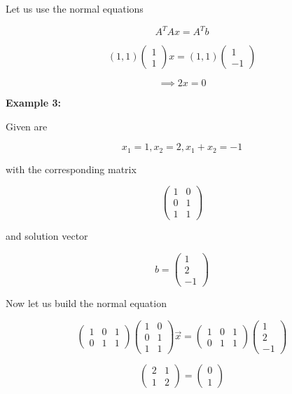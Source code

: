 Let us use the normal equations

\[
	A^T Ax = A^T b
\]

\[
	(1, 1) 
	\begin{pmatrix} 
	1 \\ 
	1
	\end{pmatrix} x
	= 
	(1, 1)
	\begin{pmatrix} 
		1 \\ 
		-1
	\end{pmatrix} 
\]

\[
	\implies 2x = 0
\]

\textbf{Example 3:}

Given are 

\[
	x_1 = 1, x_2 = 2, x_1 + x_2 = -1
\]

with the corresponding matrix

\[
	\begin{pmatrix}
		1 & 0 \\
		0 & 1 \\
		1 & 1  
	\end{pmatrix}
\]

and solution vector 

\[
	b = \begin{pmatrix}
		1 \\
		2 \\
		-1
	\end{pmatrix}
\]

Now let us build the normal equation

\[
	\begin{pmatrix}
	1 & 0 & 1 \\
	0 & 1 & 1
	\end{pmatrix}
	\begin{pmatrix}
	1 & 0 \\
	0 & 1 \\
	1 & 1  
	\end{pmatrix}
	\vec{x}
	=
	\begin{pmatrix}
	1 & 0 & 1 \\
	0 & 1 & 1
	\end{pmatrix}
	\begin{pmatrix}
	1 \\
	2 \\
	-1
	\end{pmatrix}
\]

\[
	\begin{pmatrix}
	2 & 1 \\
	1 & 2
	\end{pmatrix}
	= 
	\begin{pmatrix}
	0 \\
	1
	\end{pmatrix}
\]

